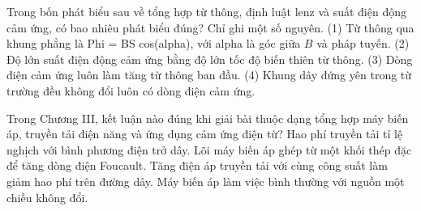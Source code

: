 \begin{ex}
Trong bốn phát biểu sau về tổng hợp từ thông, định luật lenz và suất điện động cảm ứng, có bao nhiêu phát biểu đúng? Chỉ ghi một số nguyên. (1) Từ thông qua khung phẳng là Phi = BS cos(alpha), với alpha là góc giữa $B$ và pháp tuyến. (2) Độ lớn suất điện động cảm ứng bằng độ lớn tốc độ biến thiên từ thông. (3) Dòng điện cảm ứng luôn làm tăng từ thông ban đầu. (4) Khung dây đứng yên trong từ trường đều không đổi luôn có dòng điện cảm ứng.
\end{ex}

\begin{ex}
Trong Chương III, kết luận nào đúng khi giải bài thuộc dạng tổng hợp máy biến áp, truyền tải điện năng và ứng dụng cảm ứng điện từ?
\choice
{Hao phí truyền tải tỉ lệ nghịch với bình phương điện trở dây.}
{Lõi máy biến áp ghép từ một khối thép đặc để tăng dòng điện Foucault.}
{\True Tăng điện áp truyền tải với cùng công suất làm giảm hao phí trên đường dây.}
{Máy biến áp làm việc bình thường với nguồn một chiều không đổi.}
\end{ex}

